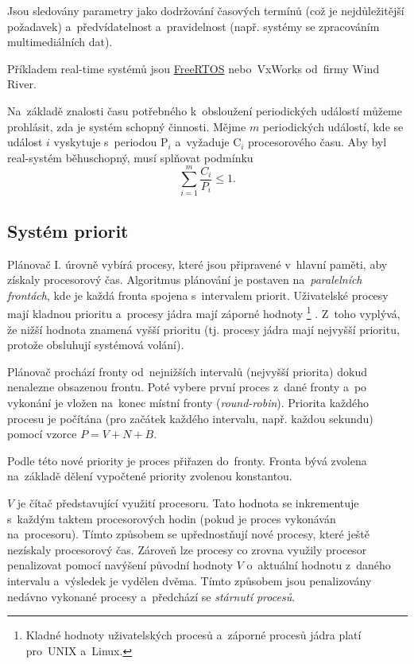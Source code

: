 Jsou sledovány parametry jako dodržování časových termínů (což je nejdůležitější požadavek) a~předvídatelnost a~pravidelnost (např. systémy se zpracováním multimediálních dat).

Příkladem real-time systémů jsou \href{https://github.com/FreeRTOS/FreeRTOS}{FreeRTOS} nebo~VxWorks od~firmy Wind River.

Na~základě znalosti času potřebného k~obsloužení periodických událostí můžeme prohlásit, zda je systém schopný činnosti. Mějme $m$ periodických událostí, kde se událost $i$ vyskytuje s~periodou $\mathrm{P}_i$ a~vyžaduje $\mathrm{C}_i$ procesorového času. Aby byl real-systém běhuschopný, musí splňovat podmínku
$$\sum\limits_{i=1}^m \frac{C_i}{P_i} \leq 1.$$

\subsection{Systém priorit}

Plánovač I. úrovně vybírá procesy, které jsou připravené v~hlavní paměti, aby získaly procesorový čas. Algoritmus plánování je postaven na~\emph{paralelních frontách}, kde je každá fronta spojena s~intervalem priorit. Uživatelské procesy mají kladnou prioritu a~procesy jádra mají záporné hodnoty%
\footnote{Kladné hodnoty uživatelských procesů a~záporné procesů jádra platí pro~UNIX a~Linux.}%
. Z~toho vyplývá, že nižší hodnota znamená vyšší prioritu (tj. procesy jádra mají nejvyšší prioritu, protože obsluhují systémová volání).

Plánovač prochází fronty od~nejnižších intervalů (nejvyšší priorita) dokud nenalezne obsazenou frontu. Poté vybere první proces z~dané fronty a~po vykonání je vložen na~konec místní fronty (\emph{round-robin}). Priorita každého procesu je počítána (pro začátek každého intervalu, např. každou sekundu) pomocí vzorce $P = V + N + B$.

Podle této nové priority je proces přiřazen do~fronty. Fronta bývá zvolena na~základě dělení vypočtené priority zvolenou konstantou.

$V$ je čítač představující využití procesoru. Tato hodnota se inkrementuje s~každým taktem procesorových hodin (pokud je proces vykonáván na~procesoru). Tímto způsobem se upřednostňují nové procesy, které ještě nezískaly procesorový čas. Zároveň lze procesy co zrovna využily procesor penalizovat pomocí navýšení původní hodnoty $V$ o~aktuální hodnotu z~daného intervalu a~výsledek je vydělen dvěma. Tímto způsobem jsou penalizovány nedávno vykonané procesy a~předchází se \emph{stárnutí procesů}.

